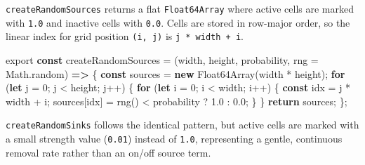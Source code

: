 \documentclass[
  letterpaper,
  DIV=11,
  numbers=noendperiod]{scrreprt}
\newenvironment{Shaded}{\begin{snugshade}}{\end{snugshade}}
\newcommand{\BuiltInTok}[1]{\textcolor[rgb]{0.00,0.23,0.31}{#1}}
\newcommand{\ControlFlowTok}[1]{\textcolor[rgb]{0.00,0.23,0.31}{\textbf{#1}}}
\newcommand{\DecValTok}[1]{\textcolor[rgb]{0.68,0.00,0.00}{#1}}
\newcommand{\FloatTok}[1]{\textcolor[rgb]{0.68,0.00,0.00}{#1}}
\newcommand{\FunctionTok}[1]{\textcolor[rgb]{0.28,0.35,0.67}{#1}}
\newcommand{\ImportTok}[1]{\textcolor[rgb]{0.00,0.46,0.62}{#1}}
\newcommand{\KeywordTok}[1]{\textcolor[rgb]{0.00,0.23,0.31}{\textbf{#1}}}
\newcommand{\NormalTok}[1]{\textcolor[rgb]{0.00,0.23,0.31}{#1}}
\newcommand{\OperatorTok}[1]{\textcolor[rgb]{0.37,0.37,0.37}{#1}}
\begin{document}
\texttt{createRandomSources} returns a flat \texttt{Float64Array} where
active cells are marked with \texttt{1.0} and inactive cells with
\texttt{0.0}. Cells are stored in row-major order, so the linear index
for grid position \texttt{(i,\ j)} is \texttt{j\ *\ width\ +\ i}.

\label{helpers-random-generators}%
\begin{Shaded}
\begin{Highlighting}[]
\ImportTok{export} \KeywordTok{const}\NormalTok{ createRandomSources }\OperatorTok{=}\NormalTok{ (width}\OperatorTok{,}\NormalTok{ height}\OperatorTok{,}\NormalTok{ probability}\OperatorTok{,}\NormalTok{ rng }\OperatorTok{=} \BuiltInTok{Math}\OperatorTok{.}\FunctionTok{random}\NormalTok{) }\KeywordTok{=\textgreater{}}\NormalTok{ \{}
    \KeywordTok{const}\NormalTok{ sources }\OperatorTok{=} \KeywordTok{new} \BuiltInTok{Float64Array}\NormalTok{(width }\OperatorTok{*}\NormalTok{ height)}\OperatorTok{;}
    \ControlFlowTok{for}\NormalTok{ (}\KeywordTok{let}\NormalTok{ j }\OperatorTok{=} \DecValTok{0}\OperatorTok{;}\NormalTok{ j }\OperatorTok{\textless{}}\NormalTok{ height}\OperatorTok{;}\NormalTok{ j}\OperatorTok{++}\NormalTok{) \{}
        \ControlFlowTok{for}\NormalTok{ (}\KeywordTok{let}\NormalTok{ i }\OperatorTok{=} \DecValTok{0}\OperatorTok{;}\NormalTok{ i }\OperatorTok{\textless{}}\NormalTok{ width}\OperatorTok{;}\NormalTok{ i}\OperatorTok{++}\NormalTok{) \{}
            \KeywordTok{const}\NormalTok{ idx }\OperatorTok{=}\NormalTok{ j }\OperatorTok{*}\NormalTok{ width }\OperatorTok{+}\NormalTok{ i}\OperatorTok{;}
\NormalTok{            sources[idx] }\OperatorTok{=} \FunctionTok{rng}\NormalTok{() }\OperatorTok{\textless{}}\NormalTok{ probability }\OperatorTok{?} \FloatTok{1.0} \OperatorTok{:} \FloatTok{0.0}\OperatorTok{;}
\NormalTok{        \}}
\NormalTok{    \}}
    \ControlFlowTok{return}\NormalTok{ sources}\OperatorTok{;}
\NormalTok{\}}\OperatorTok{;}
\end{Highlighting}
\end{Shaded}

\texttt{createRandomSinks} follows the identical pattern, but active
cells are marked with a small strength value (\texttt{0.01}) instead of
\texttt{1.0}, representing a gentle, continuous removal rate rather than
an on/off source term.
\end{document}
